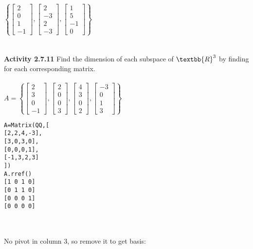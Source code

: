 \documentclass{article}
\begin{document}
{\\
$\left\{ 
\left[\begin{matrix} 2 \\ 0 \\ 1 \\ -1 \end{matrix}\right] , 
\left[\begin{matrix} 2 \\ -3 \\ 2 \\ -3 \end{matrix}\right] , 
\left[\begin{matrix} 1 \\ 5 \\ -1 \\ 0 \end{matrix}\right]
\right\}$\ \\
\\
\\
\newpage
\noindent \textbf{Activity 2.7.11} Find the dimension of each subspace of $\textbb{R}^{3}$
by finding for each corresponding matrix.\\
\\
$A =\left\{ 
\left[\begin{matrix} 2 \\ 3 \\ 0 \\ -1 \end{matrix}\right] , 
\left[\begin{matrix} 2 \\ 0 \\ 0 \\ 3 \end{matrix}\right] , 
\left[\begin{matrix} 4 \\ 3 \\ 0 \\ 2 \end{matrix}\right] , 
\left[\begin{matrix} -3 \\ 0 \\ 1 \\ 3 \end{matrix}\right] 
\right\}$
\begin{verbatim}
A=Matrix(QQ,[
[2,2,4,-3],
[3,0,3,0],
[0,0,0,1],
[-1,3,2,3]
])
A.rref()
[1 0 1 0]
[0 1 1 0]
[0 0 0 1]
[0 0 0 0]
\end{verbatim}\\
\\
No pivot in column 3, so remove it to get basis:\\
}
\end{document}
